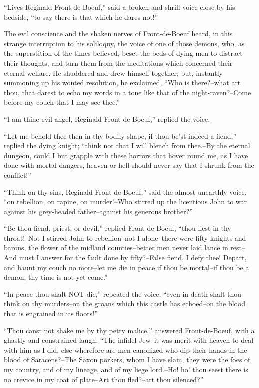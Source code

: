``Lives Reginald Front-de-Boeuf,'' said a broken and shrill voice close
by his bedside, ``to say there is that which he dares not!''

The evil conscience and the shaken nerves of Front-de-Boeuf heard, in
this strange interruption to his soliloquy, the voice of one of those
demons, who, as the superstition of the times believed, beset the beds
of dying men to distract their thoughts, and turn them from the
meditations which concerned their eternal welfare. He shuddered and drew
himself together; but, instantly summoning up his wonted resolution, he
exclaimed, ``Who is there?--what art thou, that darest to echo my words
in a tone like that of the night-raven?--Come before my couch that I may
see thee.''

``I am thine evil angel, Reginald Front-de-Boeuf,'' replied the voice.

``Let me behold thee then in thy bodily shape, if thou be'st indeed a
fiend,'' replied the dying knight; ``think not that I will blench from
thee.--By the eternal dungeon, could I but grapple with these horrors
that hover round me, as I have done with mortal dangers, heaven or hell
should never say that I shrunk from the conflict!''

``Think on thy sins, Reginald Front-de-Boeuf,'' said the almost
unearthly voice, ``on rebellion, on rapine, on murder!--Who stirred up
the licentious John to war against his grey-headed father--against his
generous brother?''

``Be thou fiend, priest, or devil,'' replied Front-de-Boeuf, ``thou
liest in thy throat!--Not I stirred John to rebellion--not I
alone--there were fifty knights and barons, the flower of the midland
counties--better men never laid lance in rest--And must I answer for the
fault done by fifty?--False fiend, I defy thee! Depart, and haunt my
couch no more--let me die in peace if thou be mortal--if thou be a
demon, thy time is not yet come.''

``In peace thou shalt NOT die,'' repeated the voice; ``even in death
shalt thou think on thy murders--on the groans which this castle has
echoed--on the blood that is engrained in its floors!''

``Thou canst not shake me by thy petty malice,'' answered
Front-de-Boeuf, with a ghastly and constrained laugh. ``The infidel
Jew--it was merit with heaven to deal with him as I did, else wherefore
are men canonized who dip their hands in the blood of Saracens?--The
Saxon porkers, whom I have slain, they were the foes of my country, and
of my lineage, and of my liege lord.--Ho! ho! thou seest there is no
crevice in my coat of plate--Art thou fled?--art thou silenced?''

